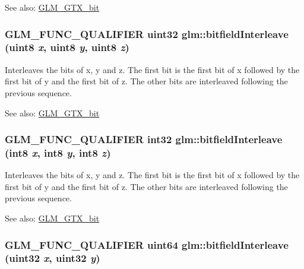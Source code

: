 \begin{Desc}
\item[See also:]\hyperlink{group__gtx__bit}{GLM\_\-GTX\_\-bit} \end{Desc}
\hypertarget{group__gtx__bit_gb9d593a2e916beb8f8137a0dbeae3afe}{
\subsubsection[bitfieldInterleave]{\setlength{\rightskip}{0pt plus 5cm}GLM\_\-FUNC\_\-QUALIFIER uint32 glm::bitfieldInterleave (uint8 {\em x}, \/  uint8 {\em y}, \/  uint8 {\em z})}}
\label{group__gtx__bit_gb9d593a2e916beb8f8137a0dbeae3afe}


Interleaves the bits of x, y and z. The first bit is the first bit of x followed by the first bit of y and the first bit of z. The other bits are interleaved following the previous sequence.

\begin{Desc}
\item[See also:]\hyperlink{group__gtx__bit}{GLM\_\-GTX\_\-bit} \end{Desc}
\hypertarget{group__gtx__bit_g6dee2ce1c45805063bb7fc5f6fd8f5ca}{
\subsubsection[bitfieldInterleave]{\setlength{\rightskip}{0pt plus 5cm}GLM\_\-FUNC\_\-QUALIFIER int32 glm::bitfieldInterleave (int8 {\em x}, \/  int8 {\em y}, \/  int8 {\em z})}}
\label{group__gtx__bit_g6dee2ce1c45805063bb7fc5f6fd8f5ca}


Interleaves the bits of x, y and z. The first bit is the first bit of x followed by the first bit of y and the first bit of z. The other bits are interleaved following the previous sequence.

\begin{Desc}
\item[See also:]\hyperlink{group__gtx__bit}{GLM\_\-GTX\_\-bit} \end{Desc}
\hypertarget{group__gtx__bit_g2bc87fd66f6f8471c1a46888360cef12}{
\subsubsection[bitfieldInterleave]{\setlength{\rightskip}{0pt plus 5cm}GLM\_\-FUNC\_\-QUALIFIER uint64 glm::bitfieldInterleave (uint32 {\em x}, \/  uint32 {\em y})}}
\label{group__gtx__bit_g2bc87fd66f6f8471c1a46888360cef12}


